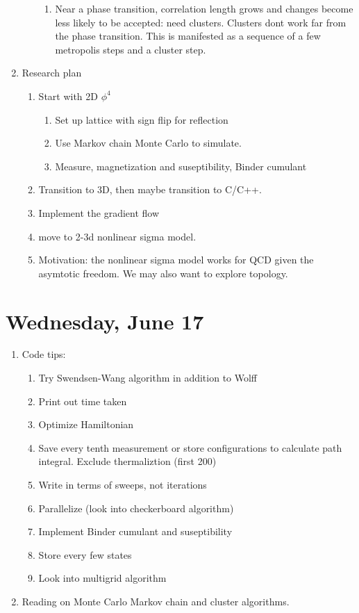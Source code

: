 \documentclass[english]{article}
\begin{document}
\begin{enumerate}
\begin{enumerate}
\begin{enumerate}
            \item Near a phase transition, correlation length grows and changes become less likely to be accepted: need clusters. Clusters dont work far from the phase transition. This is manifested as a sequence of a few metropolis steps and a cluster step.
        \end{enumerate}
    \end{enumerate}
    \item Research plan
    \begin{enumerate}
        \item Start with 2D $\phi^4$
        \begin{enumerate}
            \item Set up lattice with sign flip for reflection
            \item Use Markov chain Monte Carlo to simulate.
            \item Measure, magnetization and suseptibility, Binder cumulant
        \end{enumerate}
        \item Transition to 3D, then maybe transition to C/C++.
        \item Implement the gradient flow
        \item move to 2-3d nonlinear sigma model. 
        \item Motivation: the nonlinear sigma model works for QCD given the asymtotic freedom. We may also want to explore topology.


    \end{enumerate}
\end{enumerate}


\section{Wednesday, June 17}
\begin{enumerate}
    \item Code tips:
    \begin{enumerate}
        \item Try Swendsen-Wang algorithm in addition to Wolff
        \item Print out time taken
        \item Optimize Hamiltonian
        \item Save every tenth measurement or store configurations to calculate path integral. Exclude thermaliztion (first 200)
        \item Write in terms of sweeps, not iterations
        \item Parallelize (look into checkerboard algorithm)
        \item Implement Binder cumulant and suseptibility
        \item Store every few states
        \item Look into multigrid algorithm

    \end{enumerate}

    \item Reading on Monte Carlo Markov chain and cluster algorithms.
\end{enumerate}
\end{document}
